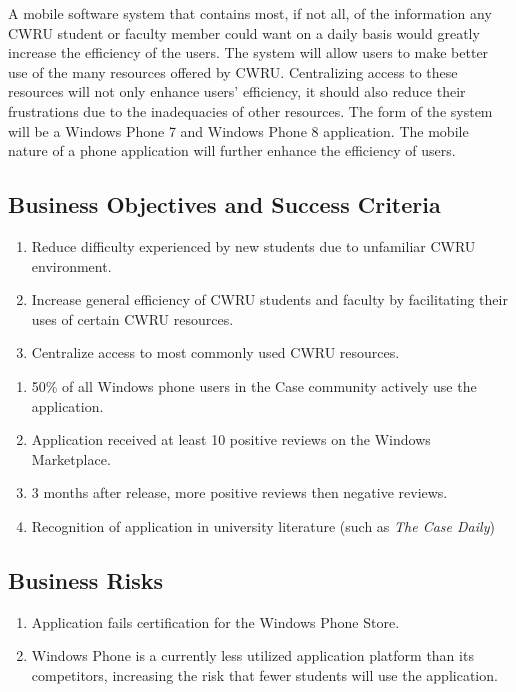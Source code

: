 \documentclass[pdftex,12pt,letter]{article}
\begin{document}
\noindent A mobile software system that contains most, if not all, of the information any CWRU student or faculty member could want on a daily basis would greatly increase the efficiency of the users. The system will allow users to make better use of the many resources offered by CWRU. Centralizing access to these resources will not only enhance users' efficiency, it should also reduce their frustrations due to the inadequacies of other resources. The form of the system will be a Windows Phone 7 and Windows Phone 8 application. The mobile nature of a phone application will further enhance the efficiency of users.

\subsection{Business Objectives and Success Criteria}
\begin{enumerate}[BO-1:]
\item Reduce difficulty experienced by new students due to unfamiliar CWRU environment.
\item Increase general efficiency of CWRU students and faculty by facilitating their uses of certain CWRU resources.
\item Centralize access to most commonly used CWRU resources.
\end{enumerate}

\begin{enumerate}[SC-1:]
\item 50\% of all Windows phone users in the Case community actively use the application.
\item Application received at least 10 positive reviews on the Windows Marketplace.
\item 3 months after release, more positive reviews then negative reviews.
\item Recognition of application in university literature (such as \emph{The Case Daily})
\end{enumerate}


\subsection{Business Risks}
\begin{enumerate}[BR-1:]
\item Application fails certification for the Windows Phone Store.
\item Windows Phone is a currently less utilized application platform than its competitors, increasing the risk that fewer students will use the application.
\end{enumerate}
\end{document}
